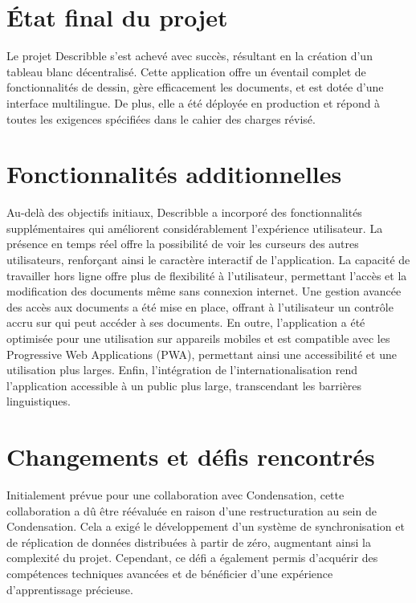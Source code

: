 \section{État final du projet}

Le projet Describble s'est achevé avec succès, résultant en la création d'un tableau blanc décentralisé. Cette application offre un éventail complet de fonctionnalités de dessin, gère efficacement les documents, et est dotée d'une interface multilingue. De plus, elle a été déployée en production et répond à toutes les exigences spécifiées dans le cahier des charges révisé.

\section{Fonctionnalités additionnelles}

Au-delà des objectifs initiaux, Describble a incorporé des fonctionnalités supplémentaires qui améliorent considérablement l'expérience utilisateur. La présence en temps réel offre la possibilité de voir les curseurs des autres utilisateurs, renforçant ainsi le caractère interactif de l'application. La capacité de travailler hors ligne offre plus de flexibilité à l'utilisateur, permettant l'accès et la modification des documents même sans connexion internet. Une gestion avancée des accès aux documents a été mise en place, offrant à l'utilisateur un contrôle accru sur qui peut accéder à ses documents. En outre, l'application a été optimisée pour une utilisation sur appareils mobiles et est compatible avec les Progressive Web Applications (PWA), permettant ainsi une accessibilité et une utilisation plus larges. Enfin, l'intégration de l'internationalisation rend l'application accessible à un public plus large, transcendant les barrières linguistiques.

\section{Changements et défis rencontrés}

Initialement prévue pour une collaboration avec Condensation, cette collaboration a dû être réévaluée en raison d'une restructuration au sein de Condensation. Cela a exigé le développement d'un système de synchronisation et de réplication de données distribuées à partir de zéro, augmentant ainsi la complexité du projet. Cependant, ce défi a également permis d'acquérir des compétences techniques avancées et de bénéficier d'une expérience d'apprentissage précieuse.

